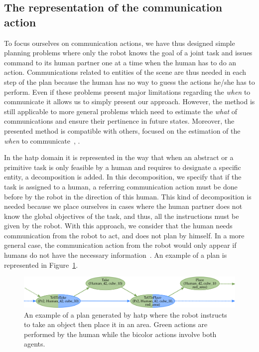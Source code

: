 \subsection{The representation of the communication action}

To focus ourselves on communication actions, we have thus designed simple planning problems where only the robot knows the goal of a joint task and issues command to its human partner one at a time when the human has to do an action. Communications related to entities of the scene are thus needed in each step of the plan because the human has no way to guess the actions he/she has to perform. Even if these problems present major limitations regarding the \textit{when} to communicate it allows us to simply present our approach. However, the method is still applicable to more general problems which need to estimate the \textit{what} of communications and ensure their pertinence in future states. Moreover, the presented method is compatible with others, focused on the estimation of the \textit{when} to communicate~\cite{devin_2016_implemented}, \cite{unhelkar_2020_decision}.

In the \acrshort{hatp} domain it is represented in the way that when an abstract or a primitive task is only feasible by a human and requires to designate a specific entity, a decomposition is added. In this decomposition, we specify that if the task is assigned to a human, a referring communication action must be done before by the robot in the direction of this human. This kind of decomposition is needed because we place ourselves in cases where the human partner does not know the global objectives of the task, and thus, all the instructions must be given by the robot. With this approach, we consider that the human needs communication from the robot to act, and does not plan by himself. In a more general case, the communication action from the robot would only appear if humans do not have the necessary information~\cite{devin_2016_implemented}. An example of a plan is represented in Figure~\ref{fig:chap5_plan}.

\begin{figure}[!ht]
\centering
\includegraphics[width=\textwidth]{figures/chapter5/plan.png}
\caption{\label{fig:chap5_plan} An example of a plan generated by \acrshort{hatp} where the robot instructs to take an object then place it in an area. Green actions are performed by the human while the bicolor actions involve both agents. }
\end{figure}

